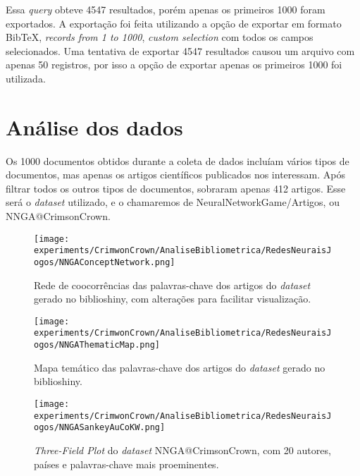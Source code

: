 Essa \textit{query} obteve 4547 resultados, porém apenas os primeiros 1000 foram exportados. A exportação foi feita utilizando a opção de exportar em formato BibTeX, \textit{records from 1 to 1000}, \textit{custom selection} com todos os campos selecionados. Uma tentativa de exportar 4547 resultados causou um arquivo com apenas 50 registros, por isso a opção de exportar apenas os primeiros 1000 foi utilizada.

\section{Análise dos dados}
Os 1000 documentos obtidos durante a coleta de dados incluíam vários tipos de documentos, mas apenas os artigos científicos publicados nos interessam. Após filtrar todos os outros tipos de documentos, sobraram apenas 412 artigos. Esse será o \textit{dataset} utilizado, e o chamaremos de NeuralNetworkGame/Artigos, ou NNGA@CrimsonCrown.

\begin{figure}
    \centering
    \texttt{[image: experiments/CrimwonCrown/AnaliseBibliometrica/RedesNeuraisJogos/NNGAConceptNetwork.png]}
    \caption{Rede de coocorrências das palavras-chave dos artigos do \textit{dataset} gerado no biblioshiny, com alterações para facilitar visualização.}
    \label{fig:CrimsonCrown:NNGA:CoOcurrence}
\end{figure}

\begin{figure}
    \centering
    \texttt{[image: experiments/CrimwonCrown/AnaliseBibliometrica/RedesNeuraisJogos/NNGAThematicMap.png]}
    \caption{Mapa temático das palavras-chave dos artigos do \textit{dataset} gerado no biblioshiny.}
    \label{fig:CrimsonCrown:NNGA:ThematicMap}
\end{figure}

\begin{figure}
    \centering
    \texttt{[image: experiments/CrimwonCrown/AnaliseBibliometrica/RedesNeuraisJogos/NNGASankeyAuCoKW.png]}
    \caption{\textit{Three-Field Plot} do \textit{dataset} NNGA@CrimsonCrown, com 20 autores, países e palavras-chave mais proeminentes.}
    \label{fig:CrimsonCrown:NNGA:}
\end{figure}